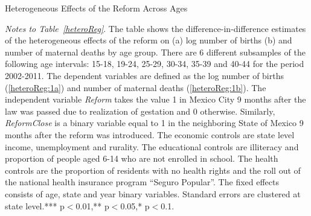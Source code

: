 \documentclass[a4paper, 11pt]{article}
\begin{document}
\begin{spacing}{2}
\begin{table}[H]  \caption{Heterogeneous Effects of the Reform Across Ages} \label{heteroReg}
\begin{threeparttable}
\begin{subtable}{1\textwidth} \label{heteroReg:1a}
{\footnotesize  }
\end{subtable}
\begin{subtable}{1\textwidth}  \label{heteroReg:1b}
{\footnotesize  }
\end{subtable}
\begin{tablenotes} 
\footnotesize
\item \textit{Notes to Table~\ref{heteroReg}}. The table shows the difference-in-difference estimates of the heterogeneous effects of the reform on (a) log number of births (b) and number of maternal deaths by age group. There are 6 different subsamples of the following age intervals: 15-18, 19-24, 25-29, 30-34, 35-39 and 40-44 for the period 2002-2011. The dependent variables are defined as the log number of births (\ref{heteroReg:1a}) and number of maternal deaths (\ref{heteroReg:1b}). The independent variable \textit{Reform} takes the value 1 in Mexico City 9 months after the law was passed due to realization of gestation and 0 otherwise. Similarly, \textit{ReformClose} is a binary variable equal to 1 in the neighboring State of Mexico 9 months after the reform was introduced. The economic controls are state level income, unemployment and rurality. The educational controls are illiteracy and proportion of people aged 6-14 who are not enrolled in school. The health controls are the proportion of residents with no health rights and the roll out of the national health insurance program ``Seguro Popular''. The fixed effects consists of age, state and year binary variables. Standard errors are clustered at state level.*** p$<$0.01,** p$<$0.05,* p$<$0.1.
\end{tablenotes}
\end{threeparttable}
\end{table}
\restoregeometry


\end{spacing}
\end{document}

